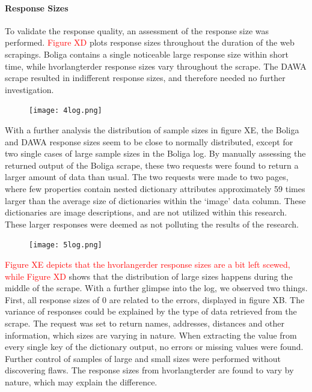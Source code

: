\documentclass[12pt,a4paper]{article}
\begin{document}
\paragraph{Response Sizes}
To validate the response quality, an assessment of the response size was performed. \textcolor{red}{Figure XD} plots response sizes throughout the duration of the web scrapings. Boliga contains a single noticeable large response size within short time, while hvorlangterder response sizes vary throughout the scrape. The DAWA scrape resulted in indifferent response sizes, and therefore needed no further investigation. 
\begin{figure}[H]
  \centering
   \caption{}
   \texttt{[image: 4log.png]} 
  \label{fig:}
\end{figure}
With a further analysis the distribution of sample sizes in figure XE, the Boliga and DAWA response sizes seem to be close to normally distributed, except for two single cases of large sample sizes in the Boliga log. By manually assessing the returned output of the Boliga scrape, these two requests were found to return a larger amount of data than usual. The two requests were made to two pages, where few properties contain nested dictionary attributes approximately 59 times larger than the average size of dictionaries within the ‘image’ data column. These dictionaries are image descriptions, and are not utilized within this research. These larger responses were deemed as not polluting the results of the research.
\begin{figure}[H]
  \centering
   \caption{}
   \texttt{[image: 5log.png]} 
  \label{fig:}
\end{figure}
\textcolor{red}{Figure XE depicts that the hvorlangerder response sizes are a bit left scewed, while Figure XD} shows that the distribution of large sizes happens during the middle of the scrape. With a further glimpse into the log, we observed two things. First, all response sizes of 0 are related to the errors, displayed in figure XB. The variance of responses could be explained by the type of data retrieved from the scrape. The request was set to return names, addresses, distances and other information, which sizes are varying in nature. When extracting the value from every single key of the dictionary output, no errors or missing values were found. Further control of samples of large and small sizes were performed without discovering flaws. The response sizes from hvorlangterder are found to vary by nature, which may explain the difference.  
\end{document}
